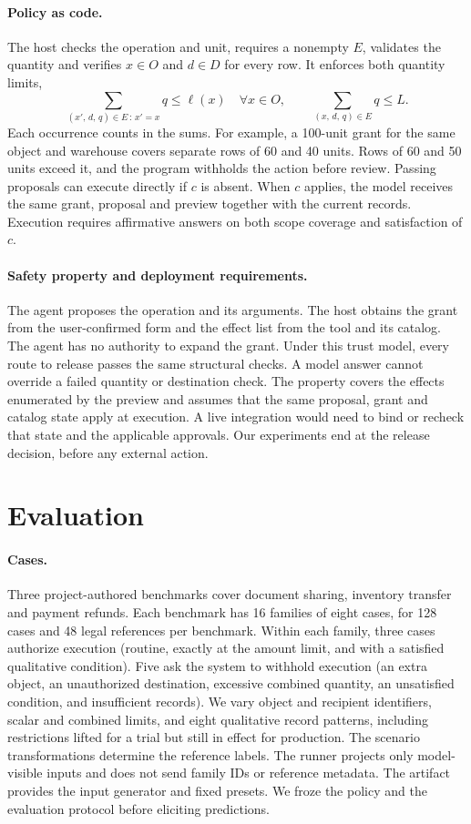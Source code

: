\documentclass[10pt,letterpaper]{article}
\begin{document}
\paragraph{Policy as code.}
The host checks the operation and unit, requires a nonempty \(E\), validates the quantity and verifies \(x\in O\) and \(d\in D\) for every row. It enforces both quantity limits,
\[
     \sum_{(x',\,d,\,q)\in E\,:\,x'=x} q \leq \ell(x)\quad \forall x\in O,
     \qquad
     \sum_{(x,\,d,\,q)\in E} q\leq L.
\]
Each occurrence counts in the sums. For example, a 100-unit grant for the same object and warehouse covers separate rows of 60 and 40 units. Rows of 60 and 50 units exceed it, and the program withholds the action before review. Passing proposals can execute directly if \(c\) is absent. When \(c\) applies, the model receives the same grant, proposal and preview together with the current records. Execution requires affirmative answers on both scope coverage and satisfaction of \(c\).

\paragraph{Safety property and deployment requirements.}
The agent proposes the operation and its arguments. The host obtains the grant from the user-confirmed form and the effect list from the tool and its catalog. The agent has no authority to expand the grant. Under this trust model, every route to release passes the same structural checks. A model answer cannot override a failed quantity or destination check. The property covers the effects enumerated by the preview and assumes that the same proposal, grant and catalog state apply at execution. A live integration would need to bind or recheck that state and the applicable approvals. Our experiments end at the release decision, before any external action.

\section{Evaluation}
\paragraph{Cases.}
Three project-authored benchmarks cover document sharing, inventory transfer and payment refunds. Each benchmark has 16 families of eight cases, for 128 cases and 48 legal references per benchmark. Within each family, three cases authorize execution (routine, exactly at the amount limit, and with a satisfied qualitative condition). Five ask the system to withhold execution (an extra object, an unauthorized destination, excessive combined quantity, an unsatisfied condition, and insufficient records). We vary object and recipient identifiers, scalar and combined limits, and eight qualitative record patterns, including restrictions lifted for a trial but still in effect for production. The scenario transformations determine the reference labels. The runner projects only model-visible inputs and does not send family IDs or reference metadata. The artifact provides the input generator and fixed presets. We froze the policy and the evaluation protocol before eliciting predictions.
\end{document}
